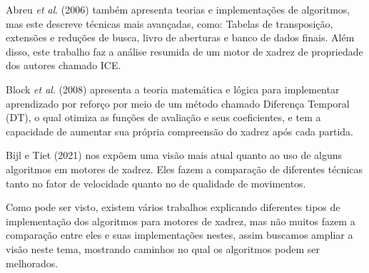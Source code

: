 Abreu \textit{et al}. (2006) também apresenta teorias e implementações de algoritmos, mas este descreve técnicas mais avançadas,
como: Tabelas de transposição, extensões e reduções de busca, livro de aberturas e banco de dados finais. Além disso,
este trabalho faz a análise resumida de um motor de xadrez de propriedade dos autores chamado ICE.

Block \textit{et al}. (2008) apresenta a teoria matemática e lógica para implementar aprendizado por reforço por meio de um
método chamado Diferença Temporal (DT), o qual otimiza as funções de avaliação e seus coeficientes, e tem a capacidade
de aumentar sua própria compreensão do xadrez após cada partida.

Bijl e Tiet (2021) nos expõem uma visão mais atual quanto ao uso de alguns algoritmos em motores de xadrez. Eles fazem
a comparação de diferentes técnicas tanto no fator de velocidade quanto no de qualidade de movimentos.

Como pode ser visto, existem vários trabalhos explicando diferentes tipos de implementação dos algoritmos para motores de xadrez,
mas não muitos fazem a comparação entre eles e suas implementações nestes, assim buscamos ampliar a visão neste tema, mostrando
caminhos no qual os algoritmos podem ser melhorados.

\nocite{CYNTIA}
\nocite{BIJIL}
\nocite{BLOCK}
\nocite{marconi6}